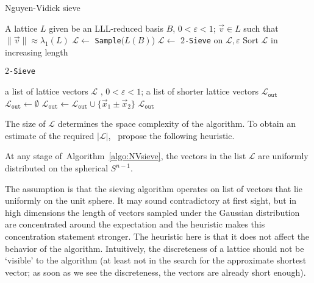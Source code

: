 \begin{algorithm}
	\caption{Nguyen-Vidick sieve~\cite{NV08}}
	\label{algo:NVsieve}
	\begin{algorithmic}[1]
		\REQUIRE A lattice $L$ given be an LLL-reduced basis $B$, $0 < \varepsilon < 1$;
		\ENSURE $\vec v \in L$ such that $\|\vec v\| \approx  \lambda_1(L)$  \vspace{1mm}
		\STATE $\mathcal{L} \gets$ \texttt{Sample}$(L(B)$)  
		\STATE $\mathcal{L} \gets $ 	\texttt{$2$-Sieve} on $\mathcal{L}, \varepsilon$
		\STATE Sort $\mathcal{L}$ in increasing length
		\ENDWHILE
	\end{algorithmic}

	\vspace{5mm}

	\texttt{$2$-Sieve}
	\begin{algorithmic}[1]
		\REQUIRE  a list of lattice vectors $\mathcal{L}$ , $0 < \varepsilon < 1$;
		\ENSURE  a list of shorter lattice vectors $\mathcal{L}_{\mathtt{out}} $ \vspace{1mm}
		\STATE $\mathcal{L}_{\mathtt{out}} \gets \emptyset$
		\STATE $\mathcal{L}_{\mathtt{out}} \gets \mathcal{L}_{\mathtt{out}}  \cup \{ \vec x_1 \pm \vec x_2  \}$ 		
		\ENDIF
		\ENDFOR
		\RETURN $\mathcal{L}_{\mathtt{out}}$
	\end{algorithmic}

	

\end{algorithm} 

The size of $\mathcal{L}$ determines the space complexity of the algorithm. To obtain an estimate of the required $|\mathcal{L}|$,~\cite{NV08} propose the following heuristic.

\begin{heuristic} \label{heur:sieve_heuristic}
	At any stage of~Algorithm~\ref{algo:NVsieve}, the vectors in the list $\mathcal{L}$
	are uniformly distributed on the spherical  $S^{n-1}$.
\end{heuristic}

The assumption is that the sieving algorithm operates on list of vectors that  lie uniformly on the unit sphere. It may sound contradictory at first sight, but in high dimensions the length of vectors sampled under the Gaussian distribution are concentrated around the expectation and the heuristic makes this concentration statement stronger. The heuristic here is that it does not affect the behavior of the algorithm. Intuitively, the discreteness of a lattice should not be `visible’ to the algorithm (at least not in the search for the approximate shortest vector; as soon as we see the discreteness, the vectors are already short enough).

